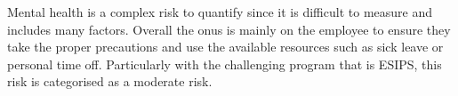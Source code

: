 Mental health is a complex risk to quantify since it is difficult to measure and includes many factors. Overall the onus is mainly on the employee to ensure they take the proper precautions and use the available resources such as sick leave or personal time off. Particularly with the challenging program that is ESIPS, this risk is categorised as a moderate risk. 
